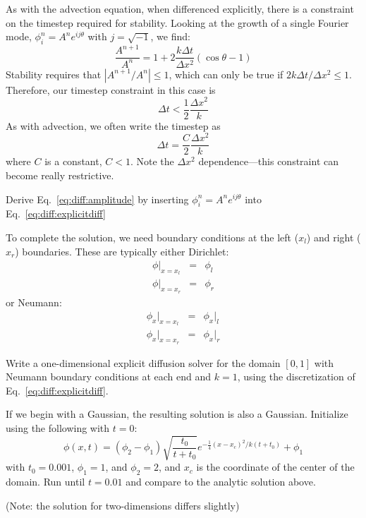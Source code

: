 As with the advection equation, when differenced explicitly, there is
a constraint on the timestep required for stability.  Looking at the
growth of a single Fourier mode, $\phi^n_i = A^n e^{ij\theta}$ with $j =
\sqrt{-1}$, we find:
\begin{equation}
\label{eq:diff:amplitude}
\frac{A^{n+1}}{A^n} = 1 + 2 \frac{k \Delta t}{\Delta x^2} ( \cos\theta - 1)
\end{equation}
Stability requires that $|A^{n+1}/A^n| \le 1$, which can only be true
if $2k\Delta t/\Delta x^2 \le 1$.  Therefore, our timestep
constraint in this case is
\begin{equation}
\label{eq:diff:dt}
\Delta t < \frac{1}{2} \frac{\Delta x^2}{k}
\end{equation}
As with advection, we often write the timestep as
\begin{equation}
\Delta t = \frac{C}{2} \frac{\Delta x^2}{k}
\end{equation}
where $C$ is a constant, $C < 1$. 
Note the $\Delta x^2$ dependence---this constraint can become really
restrictive.

\begin{exercise}
Derive Eq.~\ref{eq:diff:amplitude} by inserting $\phi^n_i = A^n e^{ij\theta}$
into Eq.~\ref{eq:diff:explicitdiff}
\end{exercise}

To complete the solution, we need boundary conditions at the left
($x_l$) and right ($x_r$) boundaries.  These are typically either
Dirichlet:
\begin{eqnarray}
\phi |_{x=x_l} &=& \phi_l\\
\phi |_{x=x_r} &=& \phi_r
\end{eqnarray}
or Neumann:
\begin{eqnarray}
\phi_x |_{x=x_l} &=& \phi_x |_l\\
\phi_x |_{x=x_r} &=& \phi_x |_r
\end{eqnarray}

\begin{exercise}
{Write a one-dimensional explicit diffusion solver for the
  domain $[0,1]$ with Neumann boundary conditions at each end and $k = 1$,
  using the discretization of Eq.~\ref{eq:diff:explicitdiff}.

  If we begin with a Gaussian, the resulting solution is also a Gaussian.
  Initialize using the following with $t = 0$:
  \begin{equation}
   \phi(x,t) = (\phi_2 - \phi_1) \sqrt{\frac{t_0}{t + t_0}} e^{-\frac{1}{4}(x - x_c)^2/k(t+t_0)} + \phi_1
  \end{equation}
  with $t_0 = 0.001$, $\phi_1 = 1$, and $\phi_2 = 2$, and $x_c$ is the
  coordinate of the center of the domain.  Run until $t = 0.01$ and
  compare to the analytic solution above.

  (Note: the solution for two-dimensions differs slightly) }
\end{exercise}


